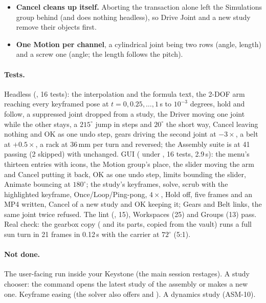 \begin{itemize}[nosep]
        (sun and planet on the carrier); a chain (J2 on J1's arm) is not a gear relationship, and the
        solver simply holds it. The panel says so. Radii are 10\,mm and $10\times$ratio (edit the joint's
        Distance for real gears); a rack's pitch radius is travel$/2\pi$.
  \item \textbf{Cancel cleans up itself.} Aborting the transaction alone left the Simulations group
        behind (and does nothing headless), so Drive Joint and a new study remove their objects first.
  \item \textbf{One Motion per channel}, a cylindrical joint being two rows (angle, length) and a screw one
        (angle; the length follows the pitch).
\end{itemize}

\paragraph{Tests.} Headless (, 16 tests): the interpolation and the
formula text, the 2-DOF arm reaching every keyframed pose at $t = 0, 0.25, \ldots, 1$\,s to $10^{-3}$
degrees, hold and follow, a suppressed joint dropped from a study, the Driver moving one joint while the
other stays, a $215^\circ$ jump in steps and $20^\circ$ the short way, Cancel leaving nothing and OK as one
undo step, gears driving the second joint at $-3\times$, a belt at $+0.5\times$, a rack at 36\,mm per turn
and reversed; the Assembly suite is at 41 passing (2 skipped) with  unchanged. GUI
( under , 16 tests, 2.9\,s): the
menu's thirteen entries with icons, the Motion group's place, the slider moving the arm and Cancel putting
it back, OK as one undo step, limits bounding the slider, Animate bouncing at $180^\circ$; the study's
keyframes, solve, scrub with the highlighted keyframe, Once/Loop/Ping-pong, $4\times$, Hold off, five
frames and an MP4 written, Cancel of a new study and OK keeping it; Gears and Belt links, the same joint
twice refused. The  lint (, 15), Workspaces (25) and Groups (13) pass.
Real check: the gearbox copy ( and its parts, copied from the vault) runs a full sun
turn in 21 frames in 0.12\,s with the carrier at $72^\circ$ (5:1).

\paragraph{Not done.} The user-facing run inside your Keystone (the main session restages). A study
chooser: the command opens the latest study of the assembly or makes a new one. Keyframe easing (the solver
also offers  and ). A dynamics study (ASM-10).

